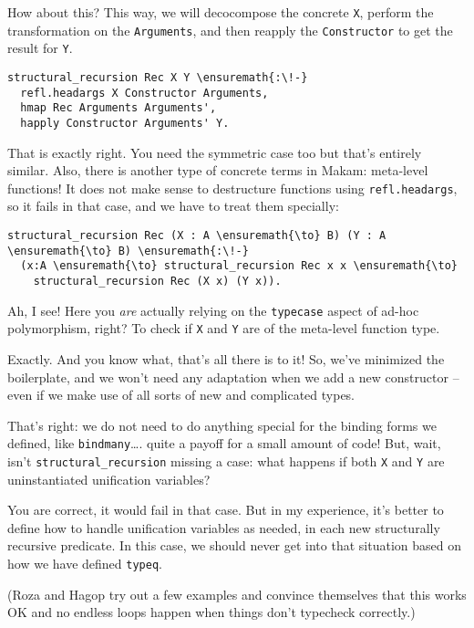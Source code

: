 \heroSTUDENT{} How about this? This way, we will decocompose the concrete
\texttt{X}, perform the transformation on the \texttt{Arguments}, and
then reapply the \texttt{Constructor} to get the result for \texttt{Y}.

\begin{verbatim}
structural_recursion Rec X Y \ensuremath{:\!-}
  refl.headargs X Constructor Arguments,
  hmap Rec Arguments Arguments',
  happly Constructor Arguments' Y.
\end{verbatim}

\heroADVISOR{} That is exactly right. You need the symmetric case too but
that's entirely similar. Also, there is another type of concrete terms
in Makam: meta-level functions! It does not make sense to destructure
functions using \texttt{refl.headargs}, so it fails in that case, and we
have to treat them specially:

\begin{verbatim}
structural_recursion Rec (X : A \ensuremath{\to} B) (Y : A \ensuremath{\to} B) \ensuremath{:\!-}
  (x:A \ensuremath{\to} structural_recursion Rec x x \ensuremath{\to}
    structural_recursion Rec (X x) (Y x)).
\end{verbatim}

\heroSTUDENT{} Ah, I see! Here you \emph{are} actually relying on the
\texttt{typecase} aspect of ad-hoc polymorphism, right? To check if
\texttt{X} and \texttt{Y} are of the meta-level function type.

\heroADVISOR{} Exactly. And you know what, that's all there is to it! So,
we've minimized the boilerplate, and we won't need any adaptation when
we add a new constructor -- even if we make use of all sorts of new and
complicated types.

\heroSTUDENT{} That's right: we do not need to do anything special for the
binding forms we defined, like \texttt{bindmany}\ldots{}. quite a payoff
for a small amount of code! But, wait, isn't
\texttt{structural\_recursion} missing a case: what happens if both
\texttt{X} and \texttt{Y} are uninstantiated unification variables?

\heroADVISOR{} You are correct, it would fail in that case. But in my
experience, it's better to define how to handle unification variables as
needed, in each new structurally recursive predicate. In this case, we
should never get into that situation based on how we have defined
\texttt{typeq}.

\begin{scenecomment}
(Roza and Hagop try out a few examples and convince themselves that this works OK and no endless loops happen when things don't typecheck correctly.)
\end{scenecomment}
